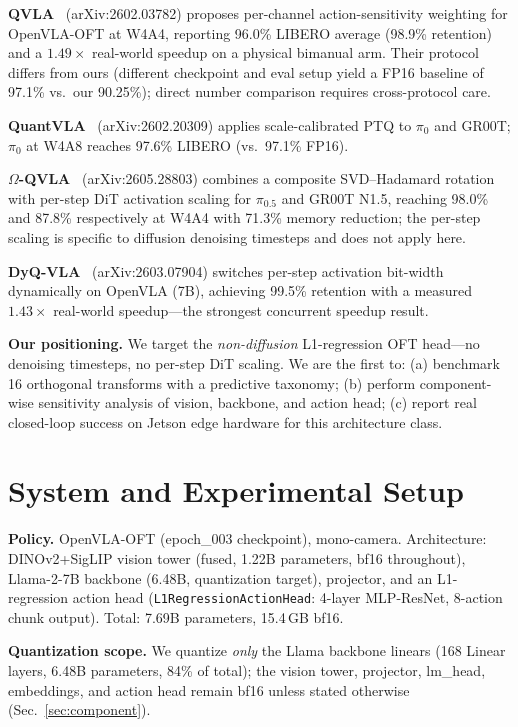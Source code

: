 \documentclass[conference]{IEEEtran}
\begin{document}
\textbf{QVLA}~\cite{qvla} (arXiv:2602.03782) proposes per-channel action-sensitivity weighting
for OpenVLA-OFT at W4A4, reporting 96.0\% LIBERO average (98.9\% retention) and a
$1.49\times$ real-world speedup on a physical bimanual arm. Their protocol differs from ours
(different checkpoint and eval setup yield a FP16 baseline of 97.1\% vs.\ our 90.25\%); direct
number comparison requires cross-protocol care.

\textbf{QuantVLA}~\cite{quantvla} (arXiv:2602.20309) applies scale-calibrated PTQ to
$\pi_0$ and GR00T; $\pi_0$ at W4A8 reaches 97.6\% LIBERO (vs.\ 97.1\% FP16).

\textbf{$\Omega$-QVLA}~\cite{omegaqvla} (arXiv:2605.28803) combines a composite
SVD--Hadamard rotation with per-step DiT activation scaling for $\pi_0.5$ and GR00T N1.5,
reaching 98.0\% and 87.8\% respectively at W4A4 with 71.3\% memory reduction; the per-step
scaling is specific to diffusion denoising timesteps and does not apply here.

\textbf{DyQ-VLA}~\cite{dyqvla} (arXiv:2603.07904) switches per-step activation bit-width
dynamically on OpenVLA (7B), achieving 99.5\% retention with a measured $1.43\times$ real-world
speedup---the strongest concurrent speedup result.

\textbf{Our positioning.} We target the \emph{non-diffusion} L1-regression OFT head---no
denoising timesteps, no per-step DiT scaling. We are the first to: (a) benchmark 16
orthogonal transforms with a predictive taxonomy; (b) perform component-wise sensitivity
analysis of vision, backbone, and action head; (c) report real closed-loop success on Jetson
edge hardware for this architecture class.

\section{System and Experimental Setup}
\label{sec:setup}

\textbf{Policy.} OpenVLA-OFT (epoch\_003 checkpoint), mono-camera. Architecture:
DINOv2+SigLIP vision tower (fused, 1.22B parameters, bf16 throughout), Llama-2-7B backbone
(6.48B, quantization target), projector, and an L1-regression action head
(\texttt{L1RegressionActionHead}: 4-layer MLP-ResNet, 8-action chunk output). Total:
7.69B parameters, 15.4\,GB bf16.

\textbf{Quantization scope.} We quantize \emph{only} the Llama backbone linears (168 Linear
layers, 6.48B parameters, 84\% of total); the vision tower, projector, lm\_head, embeddings,
and action head remain bf16 unless stated otherwise (Sec.~\ref{sec:component}).
\end{document}
